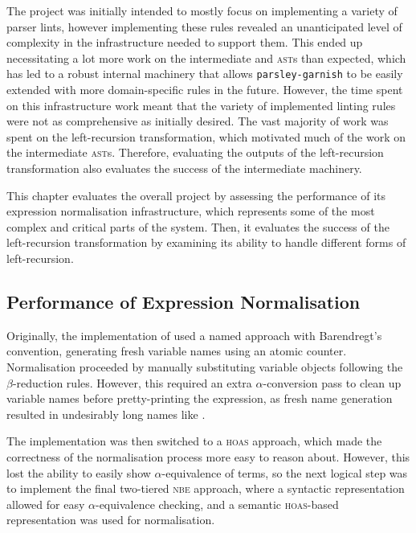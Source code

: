 \documentclass[../../main.tex]{subfiles}
\begin{document}
\label{sec:evaluation}

The project was initially intended to mostly focus on implementing a variety of parser lints, however implementing these rules revealed an unanticipated level of complexity in the infrastructure needed to support them.
This ended up necessitating a lot more work on the intermediate  and  \textsc{ast}s than expected, which has led to a robust internal machinery that allows \texttt{parsley-garnish} to be easily extended with more domain-specific rules in the future.
However, the time spent on this infrastructure work meant that the variety of implemented linting rules were not as comprehensive as initially desired.
The vast majority of work was spent on the left-recursion transformation, which motivated much of the work on the intermediate \textsc{ast}s.
Therefore, evaluating the outputs of the left-recursion transformation also evaluates the success of the intermediate machinery.

This chapter evaluates the overall project by assessing the performance of its expression normalisation infrastructure, which represents some of the most complex and critical parts of the system.
Then, it evaluates the success of the left-recursion transformation by examining its ability to handle different forms of left-recursion.

\subsection{Performance of Expression Normalisation}\label{sec:eval-exprs}
Originally, the implementation of  used a named approach with Barendregt's convention, generating fresh variable names using an atomic counter.
Normalisation proceeded by manually substituting variable objects following the $\beta$-reduction rules.
However, this required an extra $\alpha$-conversion pass to clean up variable names before pretty-printing the expression, as fresh name generation resulted in undesirably long names like .

The implementation was then switched to a \textsc{hoas} approach, which made the correctness of the normalisation process more easy to reason about.
However, this lost the ability to easily show $\alpha$-equivalence of terms, so the next logical step was to implement the final two-tiered \textsc{nbe} approach, where a syntactic representation allowed for easy $\alpha$-equivalence checking, and a semantic \textsc{hoas}-based representation was used for normalisation.
\end{document}
